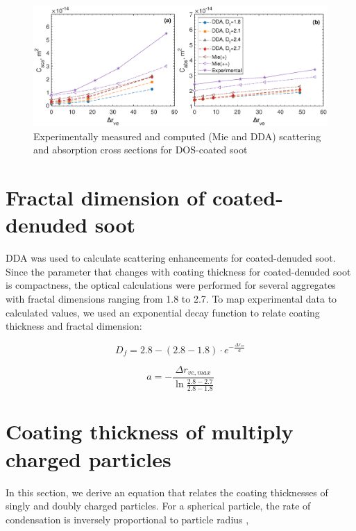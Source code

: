\documentclass[12pt]{article}
\begin{document}
\begin{figure}[htp]
\centering
\includegraphics[width=\textwidth]{images/absolute-optics-modeling.eps}
\caption{Experimentally measured and computed (Mie and DDA) scattering and absorption cross sections for DOS-coated soot}
\label{s:fig:dda}
\end{figure}

\section{Fractal dimension of coated-denuded soot}
\label{s:sec:drve2df}

DDA was used to calculate scattering enhancements for coated-denuded soot. Since the parameter that changes with coating thickness for coated-denuded soot is compactness, the optical calculations were performed for several aggregates with fractal dimensions ranging from 1.8 to 2.7. To map experimental data to calculated values, we used an exponential decay function to relate coating thickness and fractal dimension:

\begin{equation}
    D_f=2.8-(2.8-1.8)\cdot e^{-\frac{\Delta r_{ve}}{a}}
\end{equation}

\begin{equation}
    a=-\frac{\Delta r_{ve,max}}{\ln{\frac{2.8-2.7}{2.8-1.8}}}
\end{equation}

\section{Coating thickness of multiply charged particles}
\label{s:sec:drve_multiply_charged}

In this section, we derive an equation that relates the coating thicknesses of singly and doubly charged particles. For a spherical particle, the rate of condensation is inversely proportional to particle radius \citep{RN2},
\end{document}
